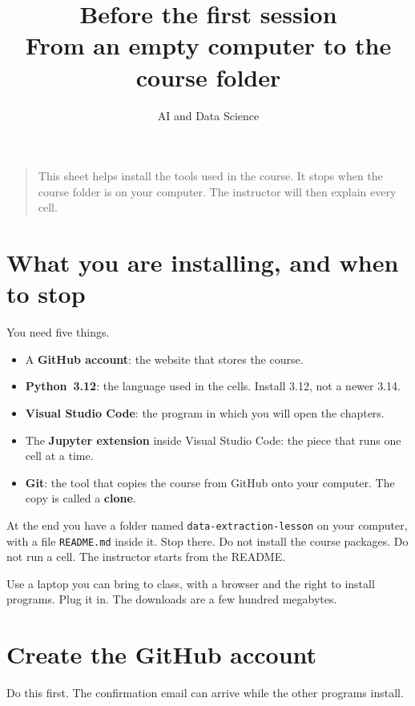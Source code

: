 \documentclass[11pt,a4paper]{article}
\title{Before the first session\\
\large From an empty computer to the course folder}
\author{AI and Data Science}
\newcommand{\file}[1]{\texttt{#1}}
\begin{document}
\maketitle

\begin{quote}
\noindent
This sheet helps install the tools used in the course. It stops when the course folder is on your computer. The instructor will then explain every cell.
\end{quote}

\tableofcontents
\vspace{0.8em}

\section{What you are installing, and when to stop}

You need five things.

\begin{itemize}
\item A \textbf{GitHub account}: the website that stores the course.
\item \textbf{Python~3.12}: the language used in the cells. Install 3.12, not a newer 3.14.
\item \textbf{Visual Studio Code}: the program in which you will open the chapters.
\item The \textbf{Jupyter extension} inside Visual Studio Code: the piece that runs one cell at a time.
\item \textbf{Git}: the tool that copies the course from GitHub onto your computer. The copy is called a \textbf{clone}.
\end{itemize}

At the end you have a folder named \file{data-extraction-lesson} on your computer, with a file \file{README.md} inside it. Stop there. Do not install the course packages. Do not run a cell. The instructor starts from the README.

Use a laptop you can bring to class, with a browser and the right to install programs. Plug it in. The downloads are a few hundred megabytes.

\section{Create the GitHub account}
\label{sec:github}

Do this first. The confirmation email can arrive while the other programs install.
\end{document}
